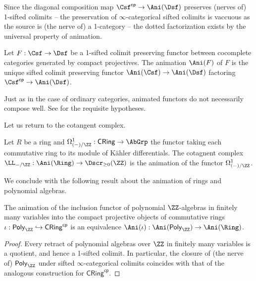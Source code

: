 Since the diagonal composition map $\Csf^{\mathsf{cp}}\to\Ani(\Dsf)$ preserves (nerves of) 1-sifted colimits -- the preservation of $\infty$-categorical sifted colimits is vaccuous as the source is (the nerve of) a 1-category -- the dotted factorization exists by the universal property of animation. 
\begin{definition}\label{def: animation of a functor}
    Let $F:\Csf\to\Dsf$ be a 1-sifted colimit preserving functor between cocomplete categories generated by compact projectives. The animation $\Ani(F)$ of $F$ is the unique sifted colimit preserving functor $\Ani(\Csf)\to\Ani(\Dsf)$ factoring $\Csf^{\mathsf{cp}}\to\Ani(\Dsf)$. 
\end{definition}
\begin{remark}
    Just as in the case of ordinary categories, animated functors do not necessarily compose well. See \cite[Prop. 5.15]{PurityFlatCohomology} for the requisite hypotheses. 
\end{remark}
Let us return to the cotangent complex. 
\begin{example}
    Let $R$ be a ring and $\Omega^{1}_{(-)/\ZZ}:\mathsf{CRing}\to\AbGrp$ the functor taking each commutative ring to its module of K\"{a}hler differentials. The cotagnent complex $\LL_{-/\ZZ}:\Ani(\Ring)\to\Dscr_{\geq0}(\ZZ)$ is the animation of the functor $\Omega^{1}_{(-)/\ZZ}$. 
\end{example}
We conclude with the following result about the animation of rings and polynomial algebras. 
\begin{proposition}\label{prop: animation of rings and poly algebras agree}
    The animation of the inclusion functor of polynomial $\ZZ$-algebras in finitely many variables into the compact projective objects of commutative rings $\iota:\mathsf{Poly}_{\ZZ}\hookrightarrow\mathsf{CRing}^{\mathsf{cp}}$ is an equivalence $\Ani(\iota):\Ani(\mathsf{Poly}_{\ZZ})\to \Ani(\Ring)$. 
\end{proposition}
\begin{proof}
    Every retract of polynomial algebras over $\ZZ$ in finitely many variables is a quotient, and hence a 1-sifted colimit. In particular, the closure of (the nerve of) $\mathsf{Poly}_{\ZZ}$ under sifted $\infty$-categorical colimits coincides with that of the analogous construction for $\mathsf{CRing}^{\mathsf{cp}}$. 
\end{proof}
